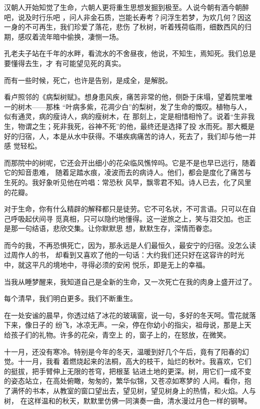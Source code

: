 \documentclass[12pt,a4paper]{article}
\begin{document}
		汉朝人开始知觉了生命，六朝人更将重生思想发掘到极至。人说今朝有酒今朝醉吧，说及时行乐吧
	，问人非金石质，岂能长寿考？问浮生若梦，为欢几何？因这一身的不可再生，我们珍爱了落花，悲伤
	了秋树，听着残荷临雨，细数西风的归期，感叹着流年暗中偷换，凄恻一场。

		孔老夫子站在千年的水畔，看流水的不舍昼夜，他说，不知生，焉知死。我们总是要懂得去生，才
	有可能望见死的真实。

		而有一些时候，死亡，也许是告别，是成全，是解脱。

		看卢照邻的《病梨树赋》。想身患风疾，痛苦非常的他，侧卧于床塌，望着院里唯一的树木——那株
	“叶病多紫，花凋少白”的梨树，发了生命的慨叹。植物与人，似有通灵，病的瘦诗人，病的瘦树木，在
	那刻上，定是相惜相怜了。说着“生非我生，物谓之生；死非我死，谷神不死”的他，最终还是选择了投
	水而死。那大概是好的归宿，人，本是从水中获得。不堪疾病痛苦的诗人，死去了，我们却与他一并感
	觉轻松。

		而那院中的树呢，它还会开出细小的花朵临风憔悴吗。它是不是也早已远行，随着它的知音患难，
	随着足踏水痕，凌波而去的病诗人。他们，都会是度化了痛苦与生死的。我好象听见他在吟唱：常恐秋
	风早，飘零君不知。诗人已去，化了风里的花瓣。

		对于生命，你有什么精辟的解释都只是徒劳。它不可名状，不可言语。只可以在自己呼吸起伏间寻
	觅真相，只可以隐约地懂得。这一逆旅之上，笑与泪交加。也正是那一句结语，悲欣交集。让你默默思
	想，默默生存，深情而眷恋。

		而今的我，不再恐惧死亡，因为，那永远是人们最恒久，最安宁的归宿。没怎么读过周作人的书，
	却看到又喜欢了他的一句话：大约我们还只好在这容许的时光中，就这平凡的境地中，寻得必须的安闲
	悦乐，即是无上的幸福。

		当我从睡梦醒来，我知道自己是全新的生命，又一次死亡在我的肉身上盛开过了。

		每个清早，我们明白更多。我们不断重生。

	\endwriting



		在一处安谧的晨早，你透过结了冰花的玻璃窗，说一句，多好的冬天呵。雪花就落下来，像日子的
	纷飞，冰凉无声。一朵，停在你幼小的指尖，祖母说，那是上天给孩子们的礼物。许多的花朵，青空上
	的，窗子上的，在怒放，在微笑。


		十一月，还没有寒冷。特别是今年的冬天，温暖到好几个午后，竟有了阳春的幻觉。十一月，我看
	着燃烧起来的法桐，高大的枝干，灿烂的秋叶。我喜欢，它们的挺拔，把手臂伸上无限的苍穹，把根茎
	钻进土地的更深。树，用它们一成不变的姿态站立，在高处俯瞰，匆匆的，繁华似锦，又苍凉如寒梦的
	人间。看你，抱了满怀的书本，从教室的窗口望出去，望见树，望见树身上的热情，和火焰。人与树，
	在这样温和的秋天，默默里仿佛一同演奏一曲，清水漫过月色一样的钢琴。
\end{document}
